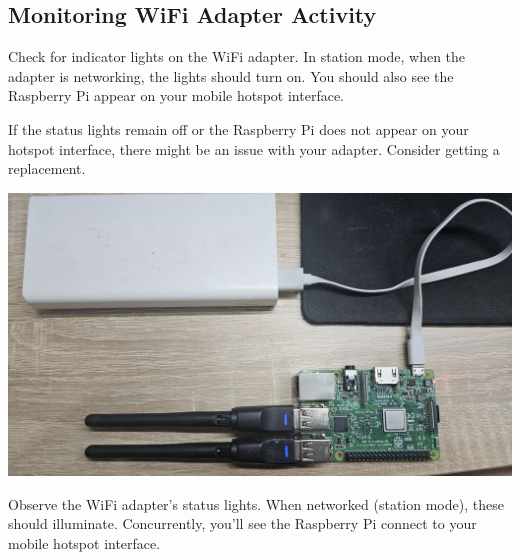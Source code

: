 \documentclass[
  letterpaper,
]{scrbook}
\begin{document}
\hypertarget{monitoring-wifi-adapter-activity}{%
\subsection{Monitoring WiFi Adapter
Activity}\label{monitoring-wifi-adapter-activity}}

Check for indicator lights on the WiFi adapter. In station mode, when
the adapter is networking, the lights should turn on. You should also
see the Raspberry Pi appear on your mobile hotspot interface.

\begin{tcolorbox}[enhanced jigsaw, bottomrule=.15mm, opacitybacktitle=0.6, toprule=.15mm, colback=white, colbacktitle=quarto-callout-note-color!10!white, left=2mm, colframe=quarto-callout-note-color-frame, coltitle=black, title=\textcolor{quarto-callout-note-color}{\faInfo}\hspace{0.5em}{Note}, opacityback=0, breakable, bottomtitle=1mm, toptitle=1mm, titlerule=0mm, arc=.35mm, leftrule=.75mm, rightrule=.15mm]

If the status lights remain off or the Raspberry Pi does not appear on
your hotspot interface, there might be an issue with your adapter.
Consider getting a replacement.

\end{tcolorbox}

\includegraphics{content/material/ch2/adapter_light.jpg}

Observe the WiFi adapter's status lights. When networked (station mode),
these should illuminate. Concurrently, you'll see the Raspberry Pi
connect to your mobile hotspot interface.
\end{document}
